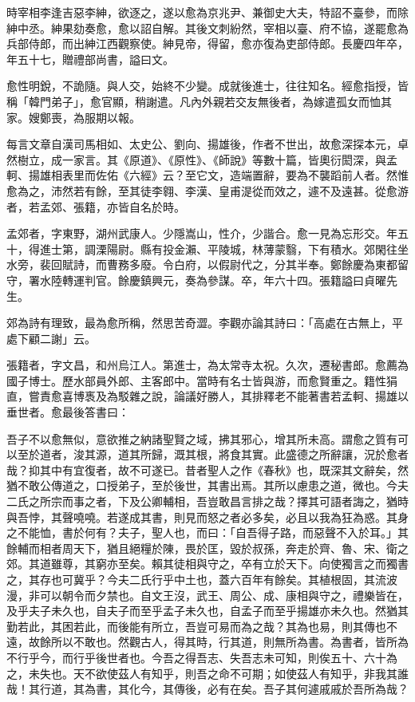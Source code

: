 \begin{pinyinscope}
 時宰相李逢吉惡李紳，欲逐之，遂以愈為京兆尹、兼御史大夫，特詔不臺參，而除紳中丞。紳果劾奏愈，愈以詔自解。其後文刺紛然，宰相以臺、府不協，遂罷愈為兵部侍郎，而出紳江西觀察使。紳見帝，得留，愈亦復為吏部侍郎。長慶四年卒，年五十七，贈禮部尚書，謚曰文。



 愈性明銳，不詭隨。與人交，始終不少變。成就後進士，往往知名。經愈指授，皆稱「韓門弟子」，愈官顯，稍謝遣。凡內外親若交友無後者，為嫁遣孤女而恤其家。嫂鄭喪，為服期以報。



 每言文章自漢司馬相如、太史公、劉向、揚雄後，作者不世出，故愈深探本元，卓然樹立，成一家言。其《原道》、《原性》、《師說》等數十篇，皆奧衍閎深，與孟軻、揚雄相表里而佐佑《六經》云？至它文，造端置辭，要為不襲蹈前人者。然惟愈為之，沛然若有餘，至其徒李翱、李漢、皇甫湜從而效之，遽不及遠甚。從愈游者，若孟郊、張籍，亦皆自名於時。



 孟郊者，字東野，湖州武康人。少隱嵩山，性介，少諧合。愈一見為忘形交。年五十，得進士第，調溧陽尉。縣有投金瀨、平陵城，林薄蒙翳，下有積水。郊閑往坐水旁，裴回賦詩，而曹務多廢。令白府，以假尉代之，分其半奉。鄭餘慶為東都留守，署水陸轉運判官。餘慶鎮興元，奏為參謀。卒，年六十四。張籍謚曰貞曜先生。



 郊為詩有理致，最為愈所稱，然思苦奇澀。李觀亦論其詩曰：「高處在古無上，平處下顧二謝」云。



 張籍者，字文昌，和州烏江人。第進士，為太常寺太祝。久次，遷秘書郎。愈薦為國子博士。歷水部員外郎、主客郎中。當時有名士皆與游，而愈賢重之。籍性狷直，嘗責愈喜博褭及為駁雜之說，論議好勝人，其排釋老不能著書若孟軻、揚雄以垂世者。愈最後答書曰：



 吾子不以愈無似，意欲推之納諸聖賢之域，拂其邪心，增其所未高。謂愈之質有可以至於道者，浚其源，道其所歸，溉其根，將食其實。此盛德之所辭讓，況於愈者哉？抑其中有宜復者，故不可遂已。昔者聖人之作《春秋》也，既深其文辭矣，然猶不敢公傳道之，口授弟子，至於後世，其書出焉。其所以慮患之道，微也。今夫二氏之所宗而事之者，下及公卿輔相，吾豈敢昌言排之哉？擇其可語者誨之，猶時與吾悖，其聲嘵嘵。若遂成其書，則見而怒之者必多矣，必且以我為狂為惑。其身之不能恤，書於何有？夫子，聖人也，而曰：「自吾得子路，而惡聲不入於耳。」其餘輔而相者周天下，猶且絕糧於陳，畏於匡，毀於叔孫，奔走於齊、魯、宋、衛之郊。其道雖尊，其窮亦至矣。賴其徒相與守之，卒有立於天下。向使獨言之而獨書之，其存也可冀乎？今夫二氏行乎中土也，蓋六百年有餘矣。其植根固，其流波漫，非可以朝令而夕禁也。自文王沒，武王、周公、成、康相與守之，禮樂皆在，及乎夫子未久也，自夫子而至乎孟子未久也，自孟子而至乎揚雄亦未久也。然猶其勤若此，其困若此，而後能有所立，吾豈可易而為之哉？其為也易，則其傳也不遠，故餘所以不敢也。然觀古人，得其時，行其道，則無所為書。為書者，皆所為不行乎今，而行乎後世者也。今吾之得吾志、失吾志未可知，則俟五十、六十為之，未失也。天不欲使茲人有知乎，則吾之命不可期；如使茲人有知乎，非我其誰哉！其行道，其為書，其化今，其傳後，必有在矣。吾子其何遽戚戚於吾所為哉？




\end{pinyinscope}

